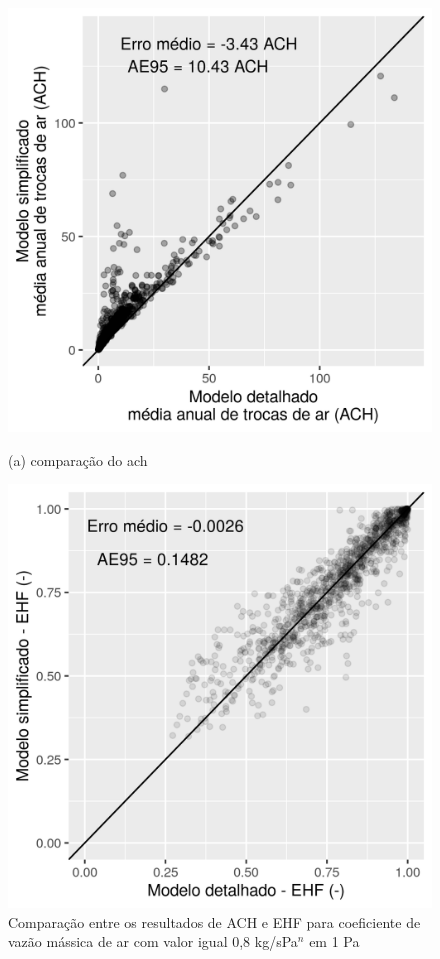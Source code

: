 \documentclass[brazil,hardcopy,openany]{ufscthesis} %
\begin{document}
\begin{figure}[h]
	\caption{Comparação entre os resultados de ACH e EHF para coeficiente de vazão mássica de ar com valor igual 0,8 kg/sPa$^n$ em 1 Pa}
	\begin{minipage}{.5\textwidth}
		\centering
		\includegraphics[width=1\linewidth]{img/cpeq_COM_80.png}
		\begin{center}
			\small{(a) comparação do \acrshort{ach}}
		\end{center}
	\end{minipage}%
	\begin{minipage}{.5\textwidth}
		\centering
		\includegraphics[width=1\linewidth]{img/cpeq_COM_80EHF.png}

\end{minipage}
\end{figure}
\end{document}
